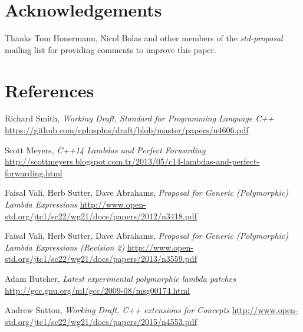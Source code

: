 \documentclass[11pt]{article}
\begin{document}
\section{Acknowledgements}
Thanks Tom Honermann, Nicol Bolas and other members of the \textit{std-proposal}
mailing list for providing comments to improve this paper.


\section{References}
\renewcommand{\section}[2]{}%
\begin{thebibliography}{9}

    Richard Smith,
    \emph{Working Draft, Standard for Programming Language C++}\newline
    \url{https://github.com/cplusplus/draft/blob/master/papers/n4606.pdf}

    Scott Meyers,
    \emph{C++14 Lambdas and Perfect Forwarding}\newline
    \url{http://scottmeyers.blogspot.com.tr/2013/05/c14-lambdas-and-perfect-forwarding.html}

    Faisal Vali, Herb Sutter, Dave Abrahams,
    \emph{Proposal for Generic (Polymorphic) Lambda Expressions}\newline
    \url{http://www.open-std.org/jtc1/sc22/wg21/docs/papers/2012/n3418.pdf}

    Faisal Vali, Herb Sutter, Dave Abrahams,
    \emph{Proposal for Generic (Polymorphic) Lambda Expressions (Revision 2)}\newline
    \url{http://www.open-std.org/jtc1/sc22/wg21/docs/papers/2013/n3559.pdf}

    Adam Butcher,
    \emph{Latest experimental polymorphic lambda patches}\newline
    \url{http://gcc.gnu.org/ml/gcc/2009-08/msg00174.html}

    Andrew Sutton,
    \emph{Working Draft, C++ extensions for Concepts}\newline
    \url{http://www.open-std.org/jtc1/sc22/wg21/docs/papers/2015/n4553.pdf}

\end{thebibliography}
\end{document}
